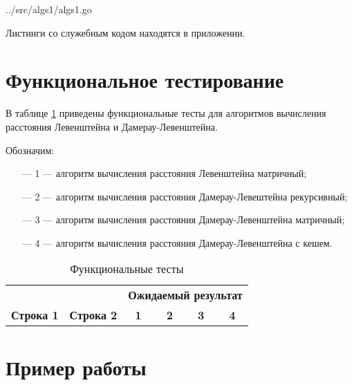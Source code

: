 \pagebreak

\begin{lstinputlisting}[
	caption={Рекурсивный с кешем (Дамерау-Левенштейн)},
	label={lst:dlevenshteincache},
	style={go},
	linerange={82-121},
	]{../src/algs1/algs1.go}
\end{lstinputlisting}

Листинги со служебным кодом находятся в приложении.

\section{Функциональное тестирование}

В таблице \ref{tabular:functional_test} приведены функциональные тесты для алгоритмов вычисления расстояния Левенштейна и Дамерау-Левенштейна.

Обозначим: 
\begin{itemize}
	\item[---] 1 --- алгоритм вычисления расстояния Левенштейна матричный;
	\item[---] 2 --- алгоритм вычисления расстояния Дамерау-Левештейна рекурсивный;
	\item[---] 3 --- алгоритм вычисления расстояния Дамерау-Левенштейна матричный;
	\item[---] 4 --- алгоритм вычисления расстояния Дамерау-Левенштейна с кешем.
\end{itemize}

\begin{table}[h]
	\begin{center}
		\caption{\label{tabular:functional_test} Функциональные тесты}
		\begin{tabular}{|c|c|c|c|c|c|}
			\hline
			                    &                    & \multicolumn{4}{c|}{\bfseries Ожидаемый результат}    \\ \cline{3-6}
			\bfseries Строка 1  & \bfseries Строка 2 & \bfseries 1 & \bfseries 2 & \bfseries 3 & \bfseries 4
				\csvreader[separator=comma]{inc/csv/functional-test.csv}{}
				{\\\hline \csvlinetotablerow}
				\\\hline
		\end{tabular}
	\end{center}
\end{table}

\pagebreak

\section{Пример работы}

